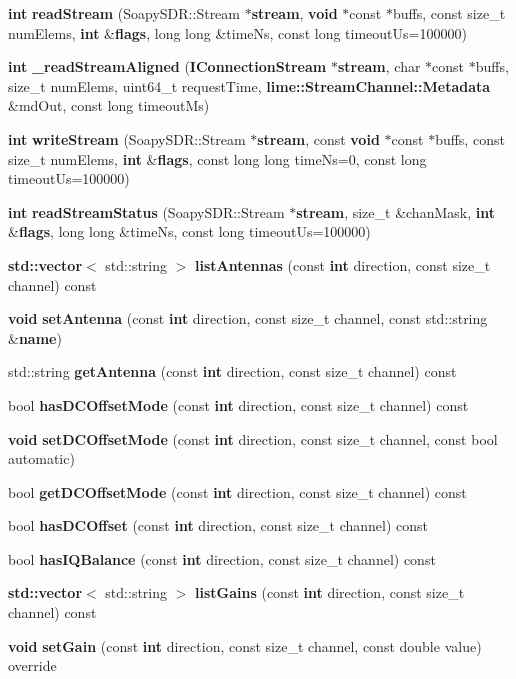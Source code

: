 \begin{DoxyCompactItemize}
\item 
{\bf int} {\bf read\+Stream} (Soapy\+S\+D\+R\+::\+Stream $\ast${\bf stream}, {\bf void} $\ast$const $\ast$buffs, const size\+\_\+t num\+Elems, {\bf int} \&{\bf flags}, long long \&time\+Ns, const long timeout\+Us=100000)
\item 
{\bf int} {\bf \+\_\+read\+Stream\+Aligned} ({\bf I\+Connection\+Stream} $\ast${\bf stream}, char $\ast$const $\ast$buffs, size\+\_\+t num\+Elems, uint64\+\_\+t request\+Time, {\bf lime\+::\+Stream\+Channel\+::\+Metadata} \&md\+Out, const long timeout\+Ms)
\item 
{\bf int} {\bf write\+Stream} (Soapy\+S\+D\+R\+::\+Stream $\ast${\bf stream}, const {\bf void} $\ast$const $\ast$buffs, const size\+\_\+t num\+Elems, {\bf int} \&{\bf flags}, const long long time\+Ns=0, const long timeout\+Us=100000)
\item 
{\bf int} {\bf read\+Stream\+Status} (Soapy\+S\+D\+R\+::\+Stream $\ast${\bf stream}, size\+\_\+t \&chan\+Mask, {\bf int} \&{\bf flags}, long long \&time\+Ns, const long timeout\+Us=100000)
\item 
{\bf std\+::vector}$<$ std\+::string $>$ {\bf list\+Antennas} (const {\bf int} direction, const size\+\_\+t channel) const 
\item 
{\bf void} {\bf set\+Antenna} (const {\bf int} direction, const size\+\_\+t channel, const std\+::string \&{\bf name})
\item 
std\+::string {\bf get\+Antenna} (const {\bf int} direction, const size\+\_\+t channel) const 
\item 
bool {\bf has\+D\+C\+Offset\+Mode} (const {\bf int} direction, const size\+\_\+t channel) const 
\item 
{\bf void} {\bf set\+D\+C\+Offset\+Mode} (const {\bf int} direction, const size\+\_\+t channel, const bool automatic)
\item 
bool {\bf get\+D\+C\+Offset\+Mode} (const {\bf int} direction, const size\+\_\+t channel) const 
\item 
bool {\bf has\+D\+C\+Offset} (const {\bf int} direction, const size\+\_\+t channel) const 
\item 
bool {\bf has\+I\+Q\+Balance} (const {\bf int} direction, const size\+\_\+t channel) const 
\item 
{\bf std\+::vector}$<$ std\+::string $>$ {\bf list\+Gains} (const {\bf int} direction, const size\+\_\+t channel) const 
\item 
{\bf void} {\bf set\+Gain} (const {\bf int} direction, const size\+\_\+t channel, const double value) override

\end{DoxyCompactItemize}
